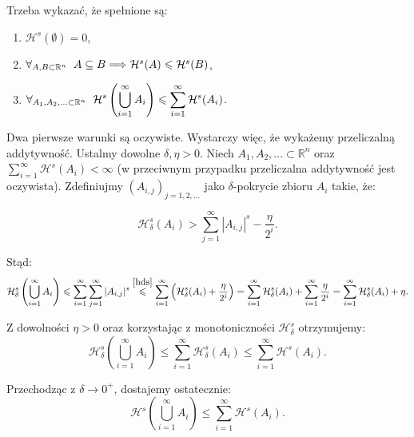 \documentclass{mini}
\begin{document}
\begin{dow}

Trzeba wykazać, że spełnione są:

\begin{enumerate}
\item $\mathcal{H}^s(\emptyset)=0$,\\
\item $\forall_{A,B \subset \mathbb{R}^n} \hspace{2mm} A \subseteq B \Longrightarrow \mathcal{H}^s(A) \leqslant \mathcal{H}^s(B)$,\\
\item $\displaystyle \forall_{A_1,A_2,\ldots \subset \mathbb{R}^n} \hspace{2mm} \mathcal{H}^s \left( \bigcup_{i=1}^{\infty} A_i \right) \leqslant \sum_{i=1}^{\infty} \mathcal{H}^s(A_i)$.
\end{enumerate}

Dwa pierwsze warunki są oczywiste. Wystarczy więc, że wykażemy przeliczalną addytywność. Ustalmy dowolne $\delta, \eta >0$. Niech $A_1,A_2,\ldots\subset\mathbb{R}^n$ oraz $\sum_{i=1}^{\infty} \mathcal{H}^s(A_i)<\infty$ (w przeciwnym przypadku przeliczalna addytywność jest oczywista). Zdefiniujmy $(A_{i,j})_{j=1,2,\ldots}$ jako $\delta$-pokrycie zbioru $A_i$ takie, że:

\begin{equation}\label{hds}
\mathcal{H}_{\delta}^s(A_i) > \sum_{j=1}^{\infty} |A_{i,j}|^s - \frac{\eta}{2^i}.
\end{equation}

Stąd:
$$ 
\mathcal{H}^s_{\delta} \left( \bigcup_{i=1}^{\infty} A_i \right) \leqslant \sum_{i=1}^{\infty} \sum_{j=1}^{\infty} |A_{i,j}|^s \stackrel{\eqref{hds}}{\leqslant} \sum_{i=1}^{\infty} \left(\mathcal{H}^s_{\delta}(A_i) + \frac{\eta}{2^i}\right) = \sum_{i=1}^{\infty} \mathcal{H}^s_{\delta}(A_i) +  \sum_{i=1}^{\infty}\frac{\eta}{2^i}=\sum_{i=1}^{\infty} \mathcal{H}^s_{\delta}(A_i) + \eta.
$$

Z dowolności $\eta>0$ oraz korzystając z monotoniczności $\mathcal{H}^s_{\delta}$ otrzymujemy:
$$ 
\mathcal{H}^s_{\delta} \left( \bigcup_{i=1}^{\infty} A_i \right) \leqslant \sum_{i=1}^{\infty} \mathcal{H}^s_{\delta}(A_i) \leqslant \sum_{i=1}^{\infty} \mathcal{H}^s (A_i).
$$

Przechodząc z $\delta\longrightarrow 0^+$, dostajemy ostatecznie:
$$ 
\mathcal{H}^s \left( \bigcup_{i=1}^{\infty} A_i \right) \leqslant \sum_{i=1}^{\infty} \mathcal{H}^s (A_i).
$$
\end{dow}
\end{document}

